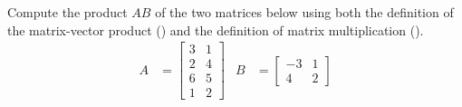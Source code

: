 Compute the product  $AB$ of the two matrices below using both the definition of the matrix-vector product () and the definition of matrix multiplication ().
%
\begin{align*}
A&=
\begin{bmatrix}
3 & 1 \\ 2 & 4 \\ 6 & 5\\1 & 2
\end{bmatrix}
&
B&=
\begin{bmatrix}
-3 & 1 \\ 4 & 2
\end{bmatrix}
\end{align*}

